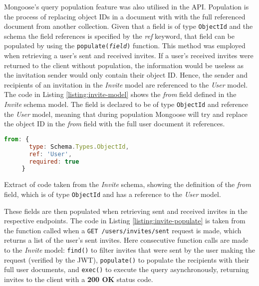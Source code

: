Mongoose's query population feature was also utilised in the API. Population is the process of replacing object IDs in a document with with the full referenced document from another collection. Given that a field is of type \verb|ObjectId| and the schema the field references is specified by the \textit{ref} keyword, that field can be populated by using the \texttt{populate(\textit{field})} function. This method was employed when retrieving a user's sent and received invites. If a user's received invites were returned to the client without population, the information would be useless as the invitation sender would only contain their object ID. Hence, the sender and recipients of an invitation in the \textit{Invite} model are referenced to the \textit{User} model. The code in Listing \ref{listing:invite-model} shows the \textit{from} field defined in the \textit{Invite} schema model. The field is declared to be of type \verb|ObjectId| and reference the \textit{User} model, meaning that during population Mongoose will try and replace the object ID in the \textit{from} field with the full user document it references.

\medskip

\begin{listing}
  \centering
  \begin{lstlisting}[language=javascript]
     from: {
       type: Schema.Types.ObjectId,
       ref: 'User',
       required: true
     }
  \end{lstlisting}
  \caption{Extract of code taken from the \textit{Invite} schema, showing the definition of the \textit{from} field, which is of type \texttt{ObjectId} and has a reference to the \textit{User} model.}
  \label{listing:invite-model}
\end{listing}

These fields are then populated when retrieving sent and received invites in the respective endpoints. The code in Listing \ref{listing:invite-populate} is taken from the function called when a \verb|GET /users/invites/sent| request is made, which returns a list of the user's sent invites. Here consecutive function calls are made to the \textit{Invite} model: \verb|find()| to filter invites that were sent by the user making the request (verified by the JWT), \verb|populate()| to populate the recipients with their full user documents, and \verb|exec()| to execute the query asynchronously, returning invites to the client with a \textbf{200 OK} status code.

\medskip

